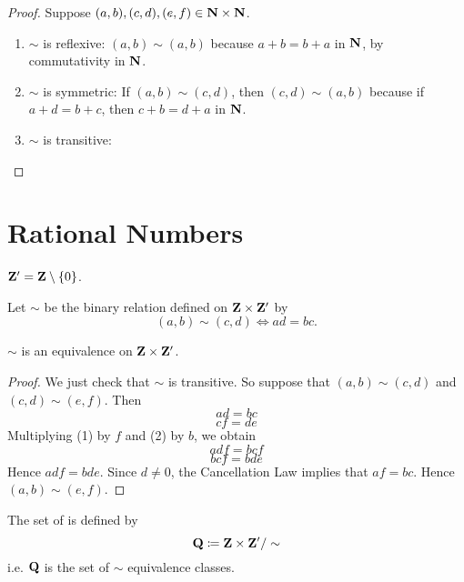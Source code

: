 \begin{proof}
Suppose $(a,b),(c,d),(e,f)\in\mathbf N\times\mathbf N$.
\begin{enumerate}[label=(\roman*)]
\item $\sim$ is reflexive: $(a,b)\sim(a,b)$ because $a+b=b+a$ in $\mathbf N$, by commutativity in $\mathbf N$.
\item $\sim$ is symmetric: If $(a,b)\sim(c,d)$, then $(c,d)\sim(a,b)$ because if $a+d=b+c$, then $c+b=d+a$ in $\mathbf N$.
\item $\sim$ is transitive: 
\end{enumerate}
\end{proof}

\pagebreak

\section{Rational Numbers}
\begin{notation}
$\mathbf Z^\prime=\mathbf Z\setminus\{0\}$.
\end{notation}

\begin{definition}
Let $\sim$ be the binary relation defined on $\mathbf Z\times\mathbf Z^\prime$ by
\[ (a,b)\sim(c,d) \iff ad=bc. \]
\end{definition}

\begin{proposition}
$\sim$ is an equivalence on $\mathbf Z\times\mathbf Z^\prime$.
\end{proposition}

\begin{proof}
We just check that $\sim$ is transitive. So suppose that $(a,b)\sim(c,d)$ and $(c,d)\sim(e,f)$. Then
\begin{equation*}\tag{1}
ad=bc
\end{equation*}
\begin{equation*}\tag{2}
cf=de
\end{equation*}
Multiplying (1) by $f$ and (2) by $b$, we obtain
\begin{equation*}\tag{3}
adf=bcf
\end{equation*}
\begin{equation*}\tag{4}
bcf=bde
\end{equation*}
Hence $adf=bde$. Since $d\neq0$, the Cancellation Law implies that $af=bc$. Hence $(a,b)\sim(e,f)$.
\end{proof}

\begin{definition}
The set of  is defined by
\[\mathbf Q\coloneqq\mathbf Z\times\mathbf Z^\prime/\sim\]
i.e. $\mathbf Q$ is the set of $\sim$ equivalence classes.
\end{definition}

